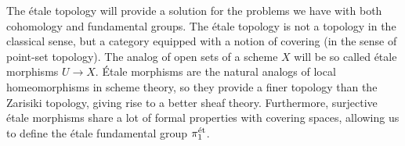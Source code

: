 The \'etale topology will provide a solution for the problems we have with both cohomology and fundamental groups. The \'etale topology is not a topology in the classical sense, but a category equipped with a notion of covering (in the sense of point-set topology). The analog of open sets of a scheme $X$ will be so called \'etale morphisms $U \to X$. \'Etale morphisms are the natural analogs of local homeomorphisms in scheme theory, so they provide a finer topology than the Zarisiki topology, giving rise to a better sheaf theory. Furthermore, surjective \'etale morphisms share a lot of formal properties with covering spaces, allowing us to define the \'etale fundamental group $\pi_1^{\text{\'et}}$.
